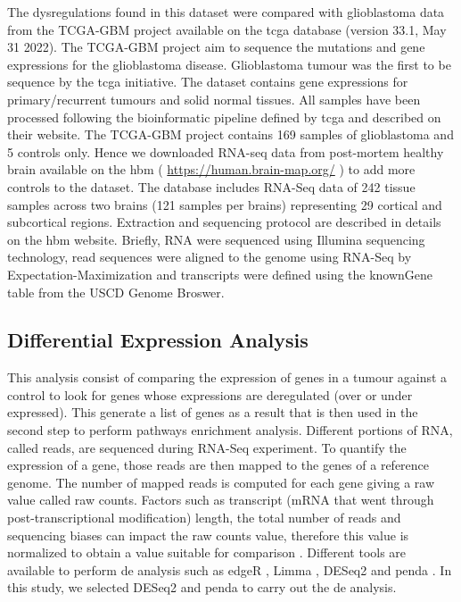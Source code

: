 The dysregulations found in this dataset were compared with glioblastoma data from the TCGA-GBM project available on the \acrshort{tcga} database (version 33.1, May 31 2022).
The TCGA-GBM project aim to sequence the mutations and gene expressions for the glioblastoma disease.
Glioblastoma tumour was the first to be sequence by the \acrshort{tcga} initiative.
The dataset contains gene expressions for primary/recurrent tumours and solid normal tissues.
All samples have been processed following the bioinformatic pipeline defined by \acrshort{tcga} and described on their website.
The TCGA-GBM project contains 169 samples of glioblastoma and 5 controls only.
Hence we downloaded RNA-seq data from post-mortem healthy brain available on the \acrfull{hbm} ( \url{https://human.brain-map.org/} ) to add more controls to the dataset.
The database includes RNA-Seq data of 242 tissue samples across two brains (121 samples per brains) representing 29 cortical and subcortical regions.
Extraction and sequencing protocol are described in details on the \acrlong{hbm} website.
Briefly, RNA were sequenced using Illumina sequencing technology, read sequences were aligned to the genome using RNA-Seq by Expectation-Maximization and transcripts were defined using the knownGene table from the USCD Genome Broswer.

\subsection{Differential Expression Analysis}

This analysis consist of comparing the expression of genes in a tumour against a control to look for genes whose expressions are deregulated (over or under expressed).
This generate a list of genes as a result that is then used in the second step to perform pathways enrichment analysis.
Different portions of RNA, called reads, are sequenced during RNA-Seq experiment.
To quantify the expression of a gene, those reads are then mapped to the genes of a reference genome.
The number of mapped reads is computed for each gene giving a raw value called raw counts.
Factors such as transcript (mRNA that went through post-transcriptional modification) length, the total number of reads and sequencing biases can impact the raw counts value, therefore this value is normalized to obtain a value suitable for comparison \cite*{Conesa2016}.
Different tools are available to perform \acrshort{de} analysis such as edgeR \cite*{Robinson2010}, Limma \cite*{Ritchie2015}, DESeq2 \cite*{Love2014} and \acrshort{penda} \cite*{Richard2020}.
In this study, we selected DESeq2 \cite*{Love2014} and \acrfull{penda} to carry out the \acrshort{de} analysis.

